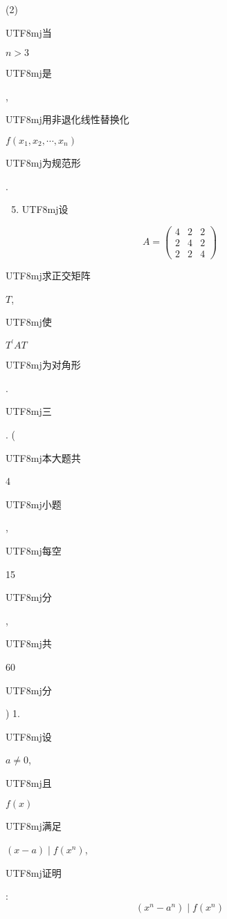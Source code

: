 \documentclass[10pt]{article}
\begin{document}
(2) \begin{CJK}{UTF8}{mj}当\end{CJK} $n>3$ \begin{CJK}{UTF8}{mj}是\end{CJK}, \begin{CJK}{UTF8}{mj}用非退化线性替换化\end{CJK} $f\left(x_{1}, x_{2}, \cdots, x_{n}\right)$ \begin{CJK}{UTF8}{mj}为规范形\end{CJK}.

\begin{enumerate}
  \setcounter{enumi}{4}
  \item \begin{CJK}{UTF8}{mj}设\end{CJK}
\end{enumerate}
$$
A=\left(\begin{array}{lll}
4 & 2 & 2 \\
2 & 4 & 2 \\
2 & 2 & 4
\end{array}\right)
$$
\begin{CJK}{UTF8}{mj}求正交矩阵\end{CJK} $T$, \begin{CJK}{UTF8}{mj}使\end{CJK} $T^{\prime} A T$ \begin{CJK}{UTF8}{mj}为对角形\end{CJK}.

\begin{CJK}{UTF8}{mj}三\end{CJK}. (\begin{CJK}{UTF8}{mj}本大题共\end{CJK} 4 \begin{CJK}{UTF8}{mj}小题\end{CJK}, \begin{CJK}{UTF8}{mj}每空\end{CJK} 15 \begin{CJK}{UTF8}{mj}分\end{CJK}, \begin{CJK}{UTF8}{mj}共\end{CJK} 60 \begin{CJK}{UTF8}{mj}分\end{CJK}) 1. \begin{CJK}{UTF8}{mj}设\end{CJK} $a \neq 0$, \begin{CJK}{UTF8}{mj}且\end{CJK} $f(x)$ \begin{CJK}{UTF8}{mj}满足\end{CJK} $(x-a) \mid f\left(x^{n}\right)$, \begin{CJK}{UTF8}{mj}证明\end{CJK}:
$$
\left(x^{n}-a^{n}\right) \mid f\left(x^{n}\right)
$$
\end{document}
